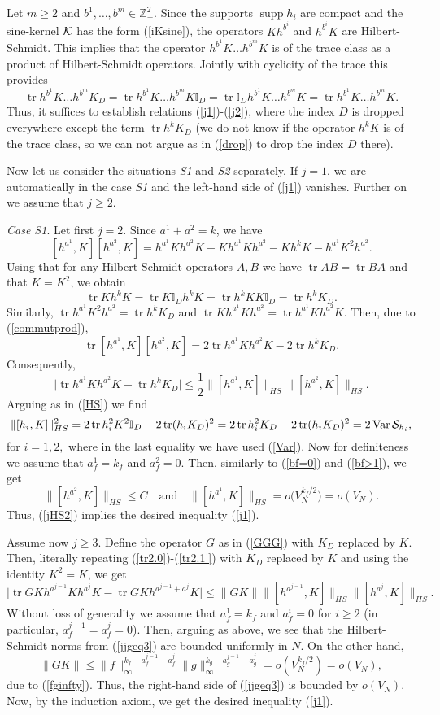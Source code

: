 \documentclass{article}
\numberwithin{equation}{section}
\newcommand{\mZ}{\mathbb{Z}}
\newcommand{\mI}{\mathbb{I}}
\newcommand{\SSS}{{\cal S}}
\newcommand{\KK}{{\cal K}}
\newcommand{\supp}{\operatorname{supp}}
\newcommand{\tr}{\operatorname{tr}}
\newcommand{\Var}{\operatorname{Var}}
\newcommand{\fr}{\frac}
\newcommand{\qmb}{\quad\mbox}
\newcommand{\qu}{\quad}
\newcommand{\lbl}{\label}
\newcommand{\bee}{\begin{equation}}
\newcommand{\eee}{\end{equation}}
\begin{document}
Let $m\geq 2$ and $b^1,\ldots, b^m\in\mZ^2_+$. Since the supports $\supp h_i$ are compact
and the sine-kernel $\KK$ has the form (\ref{iKsine}),
the operators $Kh^{b^i}$ and $h^{b^i}K$ are Hilbert-Schmidt.
This implies that the operator $h^{b^1}K\ldots h^{b^m}K$ is of the trace class
as a product of Hilbert-Schmidt operators.
Jointly with cyclicity of the trace this provides
\bee\lbl{drop}
\tr h^{b^1}K\ldots h^{b^m}K_D = \tr h^{b^1}K\ldots  h^{b^m}K \mI_D
= \tr \mI_D h^{b^1}K \ldots h^{b^m}K  = \tr h^{b^1}K \ldots h^{b^m}K.
\eee
Thus, it suffices to establish relations (\ref{j1})-(\ref{j2}), where the index $D$
is dropped everywhere except the term $\tr h^kK_{D}$
(we do not know if the operator $h^kK$ is of the trace class,
so we can not argue as in (\ref{drop}) to drop the index $D$ there).

Now let us consider the situations \emph{S1} and \emph{S2}
separately.
If $j=1$, we are automatically in the case {\it S1}
and the left-hand side of (\ref{j1}) vanishes.
Further on we assume that $j\geq 2$.

{\it Case S1}. Let first $j=2$.
Since $a^1+a^2=k$,
we have
\bee\lbl{commutprod}
[h^{a^1},K] [h^{a^2},K]
= h^{a^1}Kh^{a^2}K + Kh^{a^1}Kh^{a^2} - Kh^{k}K -h^{a^1}K^2 h^{a^2}.
\eee
Using that for any Hilbert-Schmidt operators $A,B$ we have $\tr AB=\tr BA$
and that $K=K^2$, we obtain
$$
\tr Kh^{k}K= \tr K \mI_D h^{k} K
=  \tr  h^{k} KK \mI_D =\tr  h^{k} K_D.
$$
Similarly, $\tr h^{a^1}K^2 h^{a^2}=\tr  h^{k} K_D$
and
$\tr Kh^{a^1}Kh^{a^2}= \tr h^{a^1}Kh^{a^2}K$.
Then, due to (\ref{commutprod}),
$$
\tr [h^{a^1},K] [h^{a^2},K]
= 2\tr h^{a^1}Kh^{a^2}K - 2 \tr  h^{k} K_D.
$$
Consequently,
\bee\lbl{jHS2}
\big|\tr h^{a^1}K h^{a^2}K -\tr h^k K_D \big| \leq
\fr12\|[h^{a^1},K]\|_{HS}\|[h^{a^2},K]\|_{HS}.
\eee
Arguing as in (\ref{HS}) we find
$$
\|[h_i,K]\|_{HS}^2
=2\tr h_i^2 K^2 \mI_D-2\tr (h_iK_D)^2
=2\tr h_i^2 K_D-2\tr (h_iK_D)^2
=2\Var \SSS_{h_i},
$$
for $i=1,2,$
where in the last equality we have used (\ref{Var}).
Now for definiteness we assume that $a^1_f=k_f$ and $a^2_f=0$.
Then, similarly to (\ref{bf=0}) and  (\ref{bf>1}), we get
$$
\|[h^{a^2},K]\|_{HS}\leq C \qmb{and}\qu
\|[h^{a^1},K]\|_{HS}= o\big(V_N^{k_f/2}\big)=o(V_N).
$$
Thus, (\ref{jHS2}) implies the desired inequality (\ref{j1}).

Assume now $j\geq 3$.
Define the operator $G$ as in (\ref{GGG}) with $K_D$ replaced by $K$.
Then, literally repeating (\ref{tr2.0})-(\ref{tr2.1'}) with $K_D$ replaced by $K$ and using the identity $K^2=K$, we get
\bee\lbl{jjgeq3}
\big|\tr GK h^{a^{j-1}}K h^{a^j}K -\tr GK h^{a^{j-1}+a^j} K \big| \leq
\|GK\|\|[h^{a^{j-1}},K]\|_{HS}\|[h^{a^j},K]\|_{HS}.
\eee
Without loss of generality we assume that
$a^1_f=k_f$ and $a^i_f=0$ for $i\geq 2$
(in particular, $a^{j-1}_f=a^j_f=0$).
Then, arguing as above, we see that the Hilbert-Schmidt norms from (\ref{jjgeq3}) are bounded uniformly in $N$.
On the other hand,
\bee\lbl{GKj}
\|GK\|\leq \|f\|_\infty^{k_f-a^{j-1}_f-a^j_f}\|g\|_\infty^{k_g-a^{j-1}_g-a^j_g}
= o(V_N^{k_f/2})=o(V_N),
\eee
due to (\ref{fginfty}).
Thus, the right-hand side of (\ref{jjgeq3}) is bounded by $o(V_N)$.
Now, by the induction axiom, we get the desired inequality (\ref{j1}).
\end{document}
